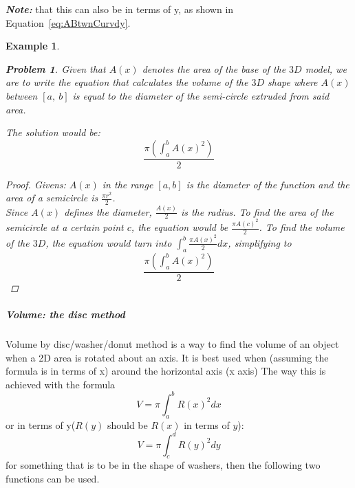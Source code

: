 \documentclass{article} %
\newtheorem{exmp}{Example}[paragraph]
\newtheorem{problem}{Problem}
\theoremstyle{theorem}
\theoremstyle{definition}
\begin{document}
                    \textbf{\textit{Note:}} that this can also be in terms of y, as shown in Equation~\ref{eq:ABtwnCurvdy}.
                    \begin{exmp}
                        \begin{problem}
                            Given that $A(x)$ denotes the area of the base of the $3D$ model, we are to write the equation that calculates the volume of the $3D$ shape where $A(x)$ between $[a,\ b]$ is equal to the diameter of the semi-circle extruded from said area.
                        \end{problem}
                        The solution would be: \[
                            \dfrac{\pi(\int_a^bA(x)^2)}{2}
                        \]
                        \begin{proof}
                            \textit{Givens}: $A(x)$ in the range $[a, b]$ is the diameter of the function and the area of a semicircle is $\frac{\pi r^2}{2}$.
                            \\Since $A(x)$ defines the diameter, $\frac{A(x)}{2}$ is the radius. To find the area of the semicircle at a certain point $c$, the equation would be $\frac{\pi A(c)^2}{2}$. To find the volume of the $3D$, the equation would turn into $\int^b_a \frac{\pi A(x)^2}{2}dx$, simplifying to 
                            $$\dfrac{\pi(\int_a^bA(x)^2)}{2}$$
                        \end{proof}
                    \end{exmp}
                \subparagraph{Volume: the disc method}
                    Volume by disc/washer/donut method is a way to find the volume of an object when a 2D area is rotated about an axis. It is best used when (assuming the formula is in terms of x) around the horizontal axis (x axis)
                    The way this is achieved with the formula 
                    \begin{equation}
                        V=\pi \int_{a}^{b}R(x)^2dx
                        \label{eq:volDiscDx}
                    \end{equation}
                    or in terms of y($R(y)$ should be $R(x)$ in terms of $y$):
                    \begin{equation}
                        V=\pi \int_{c}^{d}R(y)^2dy
                        \label{eq:volDiscDx}
                    \end{equation}
                    for something that is to be in the shape of washers, then the following two functions can be used.
\end{document}
